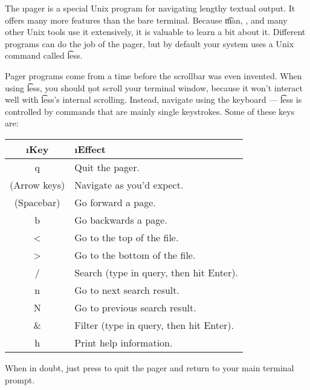 \documentclass[letterpaper, 12pt, titlepage, twoside]{article}
\begin{document}

The \i{pager} is a special Unix program for navigating lengthy textual
output. It offers many more features than the bare terminal. Because \t{man},
\git, and many other Unix tools use it extensively, it is valuable to learn a
bit about it. Different programs can do the job of the pager, but by default
your system uses a Unix command called \t{less}.

Pager programs come from a time before the scrollbar was even invented. When
using \t{less}, you should \b{not} scroll your terminal window, because it won't
interact well with \t{less}'s internal scrolling. Instead, navigate using the
keyboard --- \x \t{less} is controlled by commands that are mainly single
keystrokes. Some of these keys are:

\begin{center}
\label{l.lesskeys}
\begin{tabular}{>{\ttfamily}cl}
\rmfamily\i{Key} & \i{Effect} \\ \hline
q & Quit the pager. \\
\rmfamily(Arrow keys) & Navigate as you'd expect. \\
\rmfamily(Spacebar) & Go forward a page. \\
b & Go backwards a page. \\
< & Go to the top of the file. \\
> & Go to the bottom of the file. \\
/ & Search (type in query, then hit Enter). \\
n & Go to next search result. \\
N & Go to previous search result. \\
\& & Filter (type in query, then hit Enter). \\
h & Print help information.
\end{tabular}
\end{center}

When in doubt, just press  to quit the pager and return to your
main terminal prompt.

\end{document}
